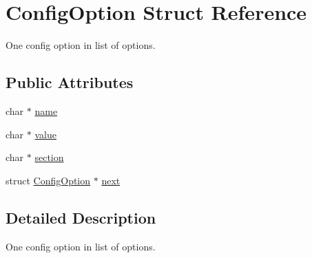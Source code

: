 \hypertarget{structConfigOption}{\section{\-Config\-Option \-Struct \-Reference}
\label{structConfigOption}
}


\-One config option in list of options.  


\subsection*{\-Public \-Attributes}
\begin{DoxyCompactItemize}
\item 
char $\ast$ \hyperlink{structConfigOption_a8dc6a5e10d3f048a19843a787614d2a4}{name}
\item 
char $\ast$ \hyperlink{structConfigOption_a7744464324b11814fb995fd01d69a595}{value}
\item 
char $\ast$ \hyperlink{structConfigOption_acca2c375d93b980a861538ceeed618b4}{section}
\item 
struct \hyperlink{structConfigOption}{\-Config\-Option} $\ast$ \hyperlink{structConfigOption_a15b925b102759c36be6462f899a7ae83}{next}
\end{DoxyCompactItemize}


\subsection{\-Detailed \-Description}
\-One config option in list of options. 

